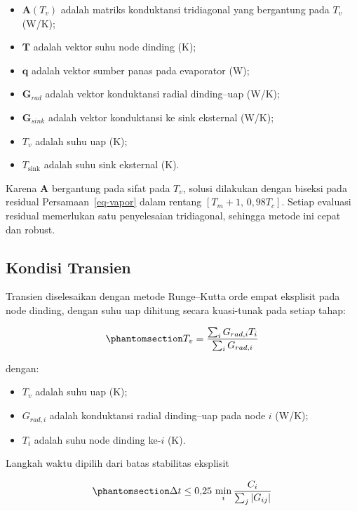 \documentclass[
  indonesian,
  12pt,
  a4paper,
]{report}
\providecommand{\tightlist}{%
  \setlength{\itemsep}{0pt}\setlength{\parskip}{0pt}}
\begin{document}
\begin{itemize}
\tightlist
\item
  \(\mathbf{A}(T_v)\) adalah matriks konduktansi tridiagonal yang
  bergantung pada \(T_v\) (W/K);
\item
  \(\mathbf{T}\) adalah vektor suhu node dinding (K);
\item
  \(\mathbf{q}\) adalah vektor sumber panas pada evaporator (W);
\item
  \(\mathbf{G}_{rad}\) adalah vektor konduktansi radial dinding--uap
  (W/K);
\item
  \(\mathbf{G}_{sink}\) adalah vektor konduktansi ke sink eksternal
  (W/K);
\item
  \(T_v\) adalah suhu uap (K);
\item
  \(T_{\mathrm{sink}}\) adalah suhu sink eksternal (K).
\end{itemize}

Karena \(\mathbf{A}\) bergantung pada sifat pada \(T_v\), solusi
dilakukan dengan biseksi pada residual Persamaan~\ref{eq-vapor} dalam
rentang \([T_m+1,\,0{,}98T_c]\). Setiap evaluasi residual memerlukan
satu penyelesaian tridiagonal, sehingga metode ini cepat dan robust.

\subsection{Kondisi Transien}\label{kondisi-transien}

Transien diselesaikan dengan metode Runge--Kutta orde empat eksplisit
pada node dinding, dengan suhu uap dihitung secara kuasi-tunak pada
setiap tahap:

\begin{equation}\protect\phantomsection\label{eq-tv}{ T_v = \frac{\sum_i G_{rad,i}T_i}{\sum_i G_{rad,i}} }\end{equation}

dengan:

\begin{itemize}
\tightlist
\item
  \(T_v\) adalah suhu uap (K);
\item
  \(G_{rad,i}\) adalah konduktansi radial dinding--uap pada node \(i\)
  (W/K);
\item
  \(T_i\) adalah suhu node dinding ke-\(i\) (K).
\end{itemize}

Langkah waktu dipilih dari batas stabilitas eksplisit

\begin{equation}\protect\phantomsection\label{eq-dt}{ \Delta t \le 0{,}25\,\min_i
   \frac{C_i}{\sum_j |G_{ij}|} }\end{equation}
\end{document}
